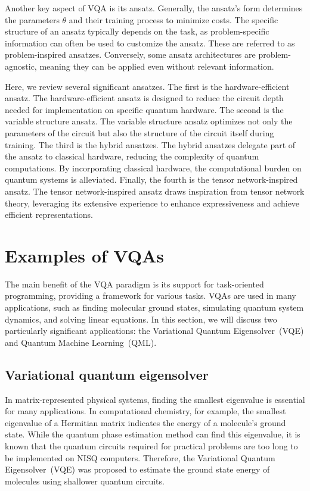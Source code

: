 \documentclass[12pt,dvipdfmx,twoside,openright]{report}
\begin{document}
Another key aspect of VQA is its ansatz. 
Generally, the ansatz's form determines the parameters $\theta$ and their training process to minimize costs. 
The specific structure of an ansatz typically depends on the task, as problem-specific information can often be used to customize the ansatz. 
These are referred to as problem-inspired ansatzes.
Conversely, some ansatz architectures are problem-agnostic, meaning they can be applied even without relevant information.

Here, we review several significant ansatzes. 
The first is the hardware-efficient ansatz. 
The hardware-efficient ansatz is designed to reduce the circuit depth needed for implementation on specific quantum hardware.
The second is the variable structure ansatz. 
The variable structure ansatz optimizes not only the parameters of the circuit but also the structure of the circuit itself during training.
The third is the hybrid ansatzes. 
The hybrid ansatzes delegate part of the ansatz to classical hardware, reducing the complexity of quantum computations. By incorporating classical hardware, the computational burden on quantum systems is alleviated. 
Finally, the fourth is the tensor network-inspired ansatz.
The tensor network-inspired ansatz draws inspiration from tensor network theory, leveraging its extensive experience to enhance expressiveness and achieve efficient representations.


\section{Examples of VQAs}
The main benefit of the VQA paradigm is its support for task-oriented programming, providing a framework for various tasks. 
VQAs are used in many applications, such as finding molecular ground states, simulating quantum system dynamics, and solving linear equations.
In this section, we will discuss two particularly significant applications: the Variational Quantum Eigensolver~(VQE) and Quantum Machine Learning~(QML).

\subsection{Variational quantum eigensolver}
In matrix-represented physical systems, finding the smallest eigenvalue is essential for many applications. 
In computational chemistry, for example, the smallest eigenvalue of a Hermitian matrix indicates the energy of a molecule's ground state. 
While the quantum phase estimation method can find this eigenvalue, it is known that the quantum circuits required for practical problems are too long to be implemented on NISQ computers.
Therefore, the Variational Quantum Eigensolver~(VQE) was proposed to estimate the ground state energy of molecules using shallower quantum circuits.
\end{document}
